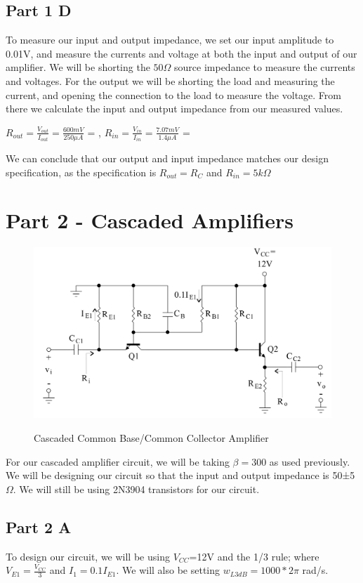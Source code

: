 \documentclass[12pt]{article}
\begin{document}
\subsection{Part 1 D}

To measure our input and output impedance, we set our input amplitude to 0.01V, and measure the currents and voltage at both the input and output of our amplifier. We will be shorting the $50\Omega$ source impedance to measure the currents and voltages. For the output we will be shorting the load and measuring the current, and opening the connection to the load to measure the voltage. From there we calculate the input and output impedance from our measured values. 
\begin{center}
$R_{out} = \frac{V_{out}}{I_{out}} = \frac{600mV}{250\mu A}$ = , $R_{in} = \frac{V_{in}}{I_{in}} =\frac{7.07mV}{1.4\mu A}$ = \boxed{5050\Omega} 
\end{center}

We can conclude that our output and input impedance matches our design specification, as the specification is $R_{out} = R_C$ and $R_{in} = 5k\Omega$



\section{Part 2 - Cascaded Amplifiers}

\begin{figure}[h!]
\centering
\includegraphics[height=0.25\textwidth]{Images/part_2_circuit.png}\\
\caption{Cascaded Common Base/Common Collector Amplifier}
\label{fig:cascadedamplifier}
\end{figure}




For our cascaded amplifier circuit, we will be taking $\beta =300$ as used previously. We will be designing our circuit so that the input and output impedance is 50±5$\Omega$. We will still be using 2N3904 transistors for our circuit. 

\subsection{Part 2 A}
To design our circuit, we will be using $V_{CC}$=12V and the 1/3 rule; where $V_{E1} = \frac{V_{CC}}{3}$
and $I_1=0.1I_{E1}$. We will also be setting $w_{L3dB} = 1000*2\pi$ rad/s.
\end{document}

